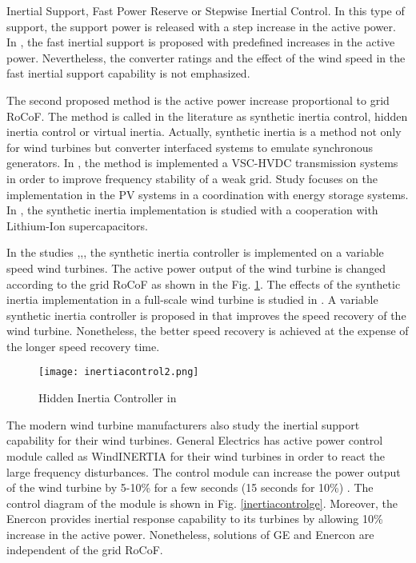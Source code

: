 Inertial Support, Fast Power Reserve or Stepwise Inertial Control. In this type of support, the support power is released with a step increase in the active power. In \cite{Hansen2014}, the fast inertial support is proposed with predefined increases in the active power. Nevertheless, the converter ratings and the effect of the wind speed in the fast inertial support capability is not emphasized. \par
The second proposed method is the active power increase proportional to grid RoCoF. The method is called in the literature as synthetic inertia control, hidden inertia control or
virtual inertia. Actually, synthetic inertia is a method not only for wind turbines but converter interfaced systems to emulate synchronous generators. In \cite{Zhu2013a}, the method is implemented a VSC-HVDC transmission systems in order to improve frequency stability of a weak grid. Study \cite{Hernandez2017} focuses on the implementation in the PV systems in a coordination with energy storage systems. In \cite{Zhu2018a}, the synthetic inertia implementation is studied with a cooperation with Lithium-Ion supercapacitors. \par
In the studies \cite{VanDeVyver2016},\cite{Conroy2008},\cite{Gonzalez-Longatt2013}, the synthetic inertia controller is implemented on a variable speed wind turbines. The active power output of the wind turbine is changed according to the grid RoCoF as shown in the Fig. \ref{inertiacontrol2}. The effects of the synthetic inertia implementation in a full-scale wind turbine is studied in \cite{Gonzalez-Longatt2013}. A variable synthetic inertia controller is proposed in \cite{Bonfiglio2019} that improves the speed recovery of the wind turbine. Nonetheless, the better speed recovery is achieved at the expense of the longer speed recovery time. \par
\begin{figure}[h!]
	\centering
	\texttt{[image: inertiacontrol2.png]}
	\caption{Hidden Inertia Controller in\cite{Gonzalez-Longatt2013}}
	\label{inertiacontrol2}
\end{figure}
The modern wind turbine manufacturers also study the inertial support capability for their wind turbines. General Electrics has active power control module called as WindINERTIA for their wind turbines in order to react the large frequency disturbances. The control module can increase the power output of the wind turbine by 5-10\% for a few seconds (15 seconds for 10\%) \cite{Clark2009}. The control diagram of the module is shown in Fig. \ref{inertiacontrolge}. Moreover, the Enercon provides inertial response capability to its turbines by allowing 10\% increase in the active power\cite{Enercon2018}. Nonetheless, solutions of GE and Enercon are independent of the grid RoCoF.\par

